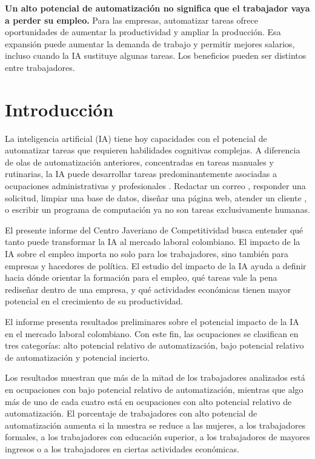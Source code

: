 \documentclass[12pt, a4paper]{article}
\begin{document}
\begin{mdframed}[
  linewidth=1pt,
  linecolor=gray!60,
  backgroundcolor=gray!6,
  innertopmargin=12pt,
  innerbottommargin=12pt,
  innerleftmargin=14pt,
  innerrightmargin=14pt
]
\textbf{Un alto potencial de automatización no significa que el trabajador vaya a perder su empleo.} Para las empresas, automatizar tareas ofrece oportunidades de aumentar la productividad y ampliar la producción. Esa expansión puede aumentar la demanda de trabajo y permitir mejores salarios, incluso cuando la IA sustituye algunas tareas. Los beneficios pueden ser distintos entre trabajadores.

\end{mdframed}

\newpage
\tableofcontents
\newpage

\section{Introducción}

La inteligencia artificial (IA) tiene hoy capacidades con el potencial de automatizar tareas que requieren habilidades cognitivas complejas. A diferencia de olas de automatización anteriores, concentradas en tareas manuales y rutinarias, la IA puede desarrollar tareas predominantemente asociadas a ocupaciones administrativas y profesionales \citep{gmyrek2025}. Redactar un correo \citep{dillon2025}, responder una solicitud, limpiar una base de datos, diseñar una página web, atender un cliente \citep{brynjolfsson2025}, o escribir un programa de computación \citep{cui2026} ya no son tareas exclusivamente humanas.

El presente informe del Centro Javeriano de Competitividad busca entender qué tanto puede transformar la IA al mercado laboral colombiano. El impacto de la IA sobre el empleo importa no solo para los trabajadores, sino también para empresas y hacedores de política. El estudio del impacto de la IA ayuda a definir hacia dónde orientar la formación para el empleo, qué tareas vale la pena rediseñar dentro de una empresa, y qué actividades económicas tienen mayor potencial en el crecimiento de su productividad.


El informe presenta resultados preliminares sobre el potencial impacto de la IA en el mercado laboral colombiano. Con este fin, las ocupaciones se clasifican en tres categorías: alto potencial relativo de automatización, bajo potencial relativo de automatización y potencial incierto. 

Los resultados muestran que más de la mitad de los trabajadores analizados está en ocupaciones con bajo potencial relativo de automatización, mientras que algo más de uno de cada cuatro está en ocupaciones con alto potencial relativo de automatización. El porcentaje de trabajadores con alto potencial de automatización aumenta si la muestra se reduce a las mujeres, a los trabajadores formales, a los trabajadores con educación superior, a los trabajadores de mayores ingresos o a los trabajadores en ciertas actividades económicas.
\end{document}
